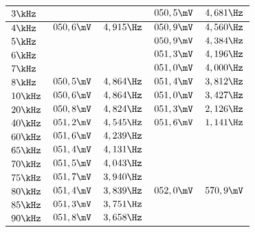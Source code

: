 \begin{table}[]
\begin{tabular}{l||l|l||l|l|}
\multicolumn{1}{|l|}{$3\kHz$}                       &$              $&$             $&$ 050,5\mV    $&$ 4,681\Hz        $\\ \hline
\multicolumn{1}{|l|}{$4\kHz$}                       &$ 050,6\mV     $&$ 4,915\Hz       $&$ 050,9\mV    $&$ 4,560\Hz        $\\ \hline
\multicolumn{1}{|l|}{$5\kHz$}                       &$              $&$             $&$ 050,9\mV    $&$ 4,384\Hz        $\\ \hline
\multicolumn{1}{|l|}{$6\kHz$}                       &$              $&$             $&$ 051,3\mV    $&$ 4,196\Hz        $\\ \hline
\multicolumn{1}{|l|}{$7\kHz$}                       &$              $&$             $&$ 051,0\mV    $&$ 4,000\Hz        $\\ \hline
\multicolumn{1}{|l|}{$8\kHz$}                       &$ 050,5\mV     $&$ 4,864\Hz       $&$ 051,4\mV    $&$ 3,812\Hz        $\\ \hline
\multicolumn{1}{|l|}{$10\kHz$}                      &$ 050,6\mV     $&$ 4,864\Hz       $&$ 051,0\mV    $&$ 3,427\Hz        $\\ \hline
\multicolumn{1}{|l|}{$20\kHz$}                      &$ 050,8\mV     $&$ 4,824\Hz       $&$ 051,3\mV    $&$ 2,126\Hz        $\\ \hline
\multicolumn{1}{|l|}{$40\kHz$}                      &$ 051,2\mV     $&$ 4,545\Hz       $&$ 051,6\mV    $&$ 1,141\Hz        $\\ \hline
\multicolumn{1}{|l|}{$60\kHz$}                      &$ 051,6\mV     $&$ 4,239\Hz       $&$             $&$              $\\ \hline
\multicolumn{1}{|l|}{$65\kHz$}                      &$ 051,4\mV     $&$ 4,131\Hz       $&$             $&$              $\\ \hline
\multicolumn{1}{|l|}{$70\kHz$}                      &$ 051,5\mV     $&$ 4,043\Hz       $&$             $&$              $\\ \hline
\multicolumn{1}{|l|}{$75\kHz$}                      &$ 051,7\mV     $&$ 3,940\Hz       $&$             $&$              $\\ \hline
\multicolumn{1}{|l|}{$80\kHz$}                      &$ 051,4\mV     $&$ 3,839\Hz       $&$ 052,0\mV    $&$ 570,9\mV     $\\ \hline
\multicolumn{1}{|l|}{$85\kHz$}                      &$ 051,3\mV     $&$ 3,751\Hz       $&$             $&$              $\\ \hline
\multicolumn{1}{|l|}{$90\kHz$}                      &$ 051,8\mV     $&$ 3,658\Hz       $&$             $&$              $\\ \hline

\end{tabular}
\end{table}
